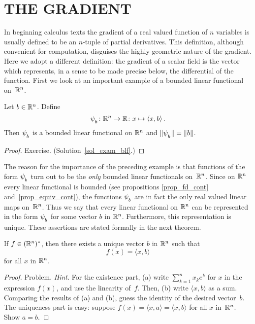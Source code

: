 \section{THE GRADIENT}  In beginning calculus texts the gradient of a real valued function of
$n$ variables is usually defined to be an $n$-tuple of partial derivatives.  This definition,
although convenient for computation, disguises the highly geometric nature of the gradient.
Here we adopt a different definition: the gradient of a scalar field is the vector which
represents, in a sense to be made precise below, the differential of the function. First we
look at an important example of a bounded linear functional on~$\mathbb{R}^n$.

\begin{exam}\label{exam_blf}  Let $b \in \mathbb{R}^n$.  Define
  \[ \psi_{{}_{\scriptstyle{b}}}\colon \mathbb{R}^n \rightarrow \mathbb{R}\colon x \mapsto \langle x,b \rangle\,. \]
Then $\psi_{{}_{\scriptstyle{b}}}$ is a bounded linear functional on $\mathbb{R}^n$ and $\lVert\psi_{{}_{\scriptstyle{b}}}\rVert =
\lVert b\rVert$.
\end{exam}

\begin{proof} Exercise.  (Solution~\ref{sol_exam_blf}.)  \ns  \end{proof}

The reason for the importance of the preceding example is that functions of the form
$\psi_{{}_{\scriptstyle{b}}}$ turn out to be the \emph{only} bounded linear functionals on~$\mathbb{R}^n$. Since
on $\mathbb{R}^n$ every linear functional is bounded (see propositions \ref{prop_fd_cont}
and~\ref{prop_equiv_cont}), the functions $\psi_{{}_{\scriptstyle{b}}}$ are in fact the only real valued
linear maps on~$\mathbb{R}^n$.  Thus we say that every linear functional on $\mathbb{R}^n$ can be
represented in the form $\psi_{{}_{\scriptstyle{b}}}$ for some vector $b$ in $\mathbb{R}^n$.  Furthermore, this
representation is unique.  These assertions are stated formally in the next theorem.

\begin{thm}\label{thm_RF} If $f \in (\mathbb{R}^n)^*$, then there exists
a unique vector $b$ in $\mathbb{R}^n$ such that
  \[ f(x) = \langle x,b \rangle \]
for all $x$ in $\mathbb{R}^n$.
\end{thm}

\begin{proof} Problem.  \emph{Hint.}  For the existence part, (a) write $\sum_{k=1}^n x_ke^k$
for $x$ in the expression $f(x)$, and use the linearity of~$f$.  Then, (b) write $\langle x,b
\rangle$ as a sum.  Comparing the results of (a) and (b), guess the identity of the desired
vector~$b$.  The uniqueness part is easy: suppose $f(x) = \langle x,a \rangle = \langle x,b
\rangle$ for all $x$ in~$\mathbb{R}^n$. Show $a = b$.    \ns
\end{proof}


